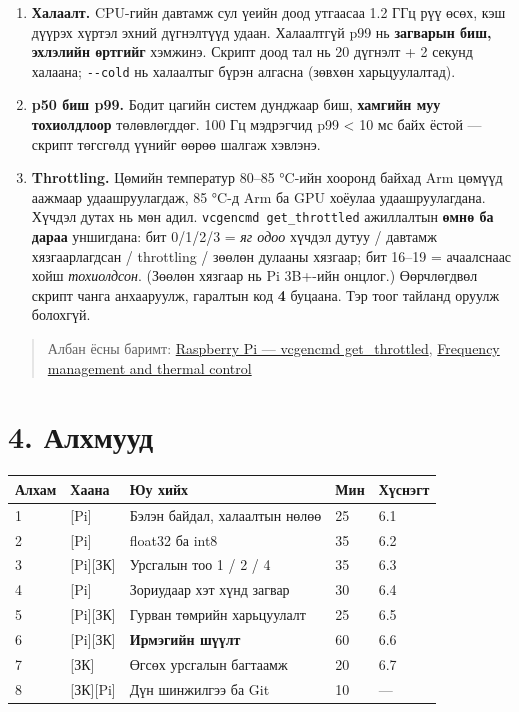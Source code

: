 \begin{enumerate}
\def\labelenumi{\arabic{enumi}.}
\tightlist
\item
  \textbf{Халаалт.} CPU-гийн давтамж сул үеийн доод утгаасаа 1.2 ГГц рүү өсөх, кэш дүүрэх хүртэл эхний дүгнэлтүүд удаан. Халаалтгүй p99 нь \textbf{загварын биш, эхлэлийн өртгийг} хэмжинэ. Скрипт доод тал нь 20 дүгнэлт + 2 секунд халаана; \texttt{-\/-cold} нь халаалтыг бүрэн алгасна (зөвхөн харьцуулалтад).
\item
  \textbf{p50 биш p99.} Бодит цагийн систем дунджаар биш, \textbf{хамгийн муу тохиолдлоор} төлөвлөгддөг. 100 Гц мэдрэгчид p99 \textless{} 10 мс байх ёстой --- скрипт төгсгөлд үүнийг өөрөө шалгаж хэвлэнэ.
\item
  \textbf{Throttling.} Цөмийн температур 80--85 °C-ийн хооронд байхад Arm цөмүүд аажмаар удаашруулагдаж, 85 °C-д Arm ба GPU хоёулаа удаашруулагдана. Хүчдэл дутах нь мөн адил. \texttt{vcgencmd\ get\_\allowbreak{}throttled} ажиллалтын \textbf{өмнө ба дараа} уншигдана: бит 0/1/2/3 = \emph{яг одоо} хүчдэл дутуу / давтамж хязгаарлагдсан / throttling / зөөлөн дулааны хязгаар; бит 16--19 = ачаалснаас хойш \emph{тохиолдсон}. (Зөөлөн хязгаар нь Pi 3B+-ийн онцлог.) Өөрчлөгдвөл скрипт чанга анхааруулж, гаралтын код \textbf{4} буцаана. Тэр тоог тайланд оруулж болохгүй.
\end{enumerate}

\begin{quote}
Албан ёсны баримт: \href{https://www.raspberrypi.com/documentation/computers/os.html}{Raspberry Pi --- vcgencmd get\_\allowbreak{}throttled}, \href{https://www.raspberrypi.com/documentation/computers/raspberry-pi.html}{Frequency management and thermal control}
\end{quote}

\hypertarget{ux430ux43bux445ux43cux443ux443ux434}{%
\section{4. Алхмууд}\label{ux430ux43bux445ux43cux443ux443ux434}}

\begingroup\scriptsize\begin{longtable}[]{@{}lllll@{}}
\toprule
Алхам & Хаана & Юу хийх & Мин & Хүснэгт\tabularnewline
\midrule
\endhead
1 & {[}Pi{]} & Бэлэн байдал, халаалтын нөлөө & 25 & 6.1\tabularnewline
2 & {[}Pi{]} & float32 ба int8 & 35 & 6.2\tabularnewline
3 & {[}Pi{]}{[}ЗК{]} & Урсгалын тоо 1 / 2 / 4 & 35 & 6.3\tabularnewline
4 & {[}Pi{]} & Зориудаар хэт хүнд загвар & 30 & 6.4\tabularnewline
5 & {[}Pi{]}{[}ЗК{]} & Гурван төмрийн харьцуулалт & 25 & 6.5\tabularnewline
6 & {[}Pi{]}{[}ЗК{]} & \textbf{Ирмэгийн шүүлт} & 60 & 6.6\tabularnewline
7 & {[}ЗК{]} & Өгсөх урсгалын багтаамж & 20 & 6.7\tabularnewline
8 & {[}ЗК{]}{[}Pi{]} & Дүн шинжилгээ ба Git & 10 & ---\tabularnewline
\bottomrule
\end{longtable}\endgroup

